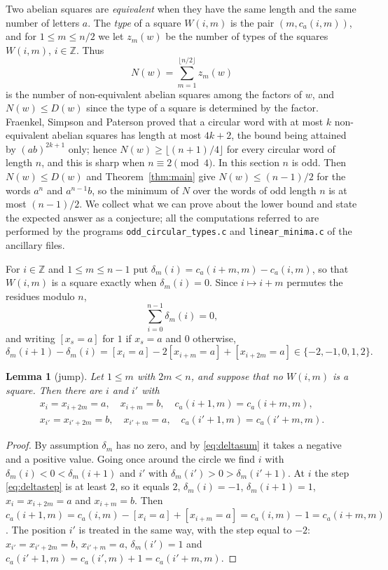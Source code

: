 \documentclass[11pt,reqno]{amsart}
\newtheorem{lemma}[theorem]{Lemma}
\theoremstyle{definition}
\newcommand{\Z}{\mathbb{Z}}
\newcommand{\fl}[1]{\lfloor #1\rfloor}
\begin{document}
Two abelian squares are \emph{equivalent} \cite{FSP97,Sim18} when they have the same length and the same number of letters $a$. The \emph{type} of a square $W(i,m)$ is the pair $(m,c_a(i,m))$, and for $1\le m\le n/2$ we let $z_m(w)$ be the number of types of the squares $W(i,m)$, $i\in\Z$. Thus
\[
N(w)=\sum_{m=1}^{\fl{n/2}}z_m(w)
\]
is the number of non-equivalent abelian squares among the factors of $w$, and $N(w)\le D(w)$ since the type of a square is determined by the factor. Fraenkel, Simpson and Paterson \cite{FSP97} proved that a circular word with at most $k$ non-equivalent abelian squares has length at most $4k+2$, the bound being attained by $(ab)^{2k+1}$ only; hence $N(w)\ge\fl{(n+1)/4}$ for every circular word of length $n$, and this is sharp when $n\equiv 2\pmod 4$. In this section $n$ is odd. Then $N(w)\le D(w)$ and Theorem~\ref{thm:main} give $N(w)\le (n-1)/2$ for the words $a^n$ and $a^{n-1}b$, so the minimum of $N$ over the words of odd length $n$ is at most $(n-1)/2$. We collect what we can prove about the lower bound and state the expected answer as a conjecture; all the computations referred to are performed by the programs \texttt{odd\_circular\_types.c} and \texttt{linear\_minima.c} of the ancillary files.

For $i\in\Z$ and $1\le m\le n-1$ put $\delta_m(i)=c_a(i+m,m)-c_a(i,m)$, so that $W(i,m)$ is a square exactly when $\delta_m(i)=0$. Since $i\mapsto i+m$ permutes the residues modulo $n$,
\begin{equation}\label{eq:deltasum}
\sum_{i=0}^{n-1}\delta_m(i)=0,
\end{equation}
and writing $[x_s=a]$ for $1$ if $x_s=a$ and $0$ otherwise,
\begin{equation}\label{eq:deltastep}
\delta_m(i+1)-\delta_m(i)=[x_i=a]-2[x_{i+m}=a]+[x_{i+2m}=a]\in\{-2,-1,0,1,2\}.
\end{equation}

\begin{lemma}[jump]\label{lem:jump}
Let $1\le m$ with $2m<n$, and suppose that no $W(i,m)$ is a square. Then there are $i$ and $i'$ with
\begin{align*}
x_i=x_{i+2m}=a,\quad x_{i+m}=b,\quad c_a(i+1,m)=c_a(i+m,m),\\
x_{i'}=x_{i'+2m}=b,\quad x_{i'+m}=a,\quad c_a(i'+1,m)=c_a(i'+m,m).
\end{align*}
\end{lemma}

\begin{proof}
By assumption $\delta_m$ has no zero, and by \eqref{eq:deltasum} it takes a negative and a positive value. Going once around the circle we find $i$ with $\delta_m(i)<0<\delta_m(i+1)$ and $i'$ with $\delta_m(i')>0>\delta_m(i'+1)$. At $i$ the step \eqref{eq:deltastep} is at least $2$, so it equals $2$, $\delta_m(i)=-1$, $\delta_m(i+1)=1$, $x_i=x_{i+2m}=a$ and $x_{i+m}=b$. Then $c_a(i+1,m)=c_a(i,m)-[x_i=a]+[x_{i+m}=a]=c_a(i,m)-1=c_a(i+m,m)$. The position $i'$ is treated in the same way, with the step equal to $-2$: $x_{i'}=x_{i'+2m}=b$, $x_{i'+m}=a$, $\delta_m(i')=1$ and $c_a(i'+1,m)=c_a(i',m)+1=c_a(i'+m,m)$.
\end{proof}
\end{document}
